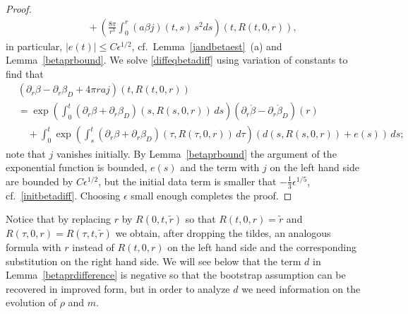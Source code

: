 \documentclass[11pt]{article}
\begin{document}
\begin{proof}
\begin{align*}
     & \quad
     {}+\left(\frac{8\pi}{r^3}\int_0^r (a \beta j)(t,s)\, s^2 ds\right)
     (t,R(t,0,r)),
   \end{align*}
   in particular, $|e(t)| \leq C \epsilon^{1/2}$,
   cf.\ Lemma~\ref{jandbetaest}~(a)
   and Lemma~\ref{betaprbound}.
   We solve \eqref{diffeqbetadiff} using variation of
   constants to find that
   \begin{align*}
    &
     (\partial_r \beta-\partial_r \beta_D +4\pi r a j) (t,R(t,0,r)) \\
     &
     = \exp\left(\int_0^t(\partial_r\beta + \partial_r \beta_D)(s,R(s,0,r))
     \, ds\right)
     (\partial_r\mathring\beta  - \partial_r \mathring\beta_D)(r)\\
     &\quad
     {}+ \int_0^t 
     \exp\left(\int_s^t(\partial_r\beta + \partial_r \beta_D)(\tau,R(\tau,0,r))
     \,d\tau\right)
     \left(d(s,R(s,0,r)) + e(s)\right)\,ds;
   \end{align*}
   note that $j$ vanishes initially.
   By Lemma~\ref{betaprbound} the argument of the
   exponential function is bounded,
   $e(s)$ and the term with $j$ on the left hand side are bounded by
   $C \epsilon^{1/2}$, but the initial data term is smaller that
   $-\frac{1}{3}\epsilon^{1/5}$,
   cf.~\eqref{initbetadiff}.
   Choosing $\epsilon$ small enough completes the proof.
\end{proof}

Notice that by replacing $r$ by $R(0,t,\tilde r)$ so that
$R(t,0,r)=\tilde r$ and
$R(\tau,0,r)=R(\tau,t,\tilde r)$ we obtain, after dropping the
tildes, an analogous formula
with $r$ instead of $R(t,0,r)$ on the left hand side and the
corresponding substitution
on the right hand side.
We will see below that the term $d$ in Lemma~\ref{betaprdifference} is negative
so that the bootstrap assumption can be recovered in improved form, but in order
to analyze $d$ we need information on the evolution of $\rho$ and $m$.
%
%
\end{document}
